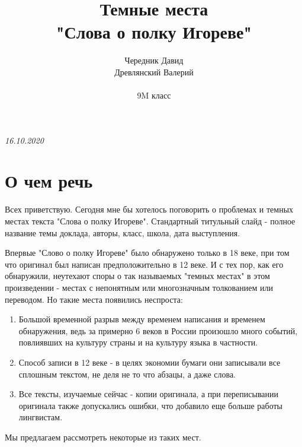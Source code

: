\documentclass[14pt, a4paper]{article}
\title{\Huge\bfseries Темные места \\ \Huge\bfseries "Слова о полку Игореве"}
\author{\huge Чередник Давид \\ \huge Древлянский Валерий \\\\ \Large 9M класс}
\date{}
\newcommand{\descr}[1]
{\par\noindent\rule{0.5\textwidth}{0.4pt} \par {\large #1} \par\noindent\rule{0.5\textwidth}{0.4pt}}
\begin{document}
\clearpage\maketitle
\begin{center}
  \itshape 16.10.2020
\end{center}
\thispagestyle{empty}

\newpage

\tableofcontents

\newpage

{\Large

\section{О чем речь}
Всех приветствую. Сегодня мне бы хотелось поговорить о проблемах и темных местах текста "Слова о полку Игореве".
  Стандартный титульный слайд - полное название темы доклада, авторы, класс, школа, дата выступления.}
\par Впервые "Слово о полку Игореве" было обнаружено только в 18 веке, при том что оригинал был написан предположительно в 12 веке. И с тех пор, как его обнаружили, неутехают споры о так называемых "темных местах" в этом произведении - местах с непонятным или многозначным толкованием или переводом. Но такие места появились неспроста:
\begin{enumerate}
  \item Большой временной разрыв между временем написания и временем обнаружения, ведь за примерно 6 веков в России произошло много событий, повлиявших на культуру страны и на культуру языка в частности.
  \item Способ записи в 12 веке - в целях экономии бумаги они записывали все сплошным текстом, не деля не то что абзацы, а даже слова.
  \item Все тексты, изучаемые сейчас - копии оригинала, а при переписывании оригинала также допускались ошибки, что добавило еще больше работы лингвистам.
\end{enumerate}
\par Мы предлагаем рассмотреть некоторые из таких мест.
\end{document}
